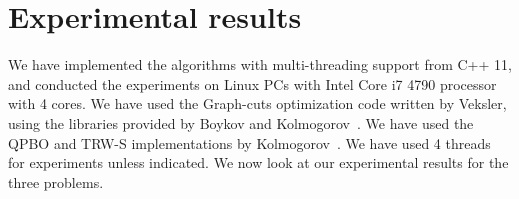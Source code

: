 \section{Experimental results}
\label{section:results} We have implemented the algorithms with
multi-threading support from C++ 11, and conducted the experiments on
Linux PCs with Intel Core i7 4790 processor with 4 cores. We have used
the Graph-cuts optimization code written by Veksler, using the libraries
provided by Boykov and
Kolmogorov~\cite{middlebury_mrf,alpha_expansion,what_energy_can_be_min_by_gc,mrf_experimental}.
%
%
We have used the QPBO and TRW-S implementations by
Kolmogorov~\cite{QPBO, TRW-S_implementation}. We have used 4 threads
for experiments unless indicated. We now look at our experimental
results for the three problems.










